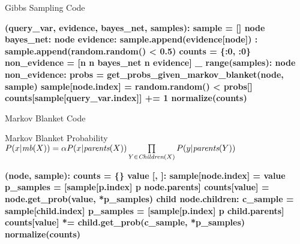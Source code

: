 \documentclass[14pt]{beamer}
\begin{document}
\begin{frame}[fragile]{Gibbs Sampling Code}
	\begin{semiverbatim}\scriptsize\bfseries
		 (query_var, evidence, bayes_net, samples):
		    \pause{}
		    sample = []
		     node  bayes_net:
		         node  evidence:
		            sample.append(evidence[node])
		        :
		            sample.append(random.random() < \num{0.5})
		    \pause{}
		    counts = \{:\num{0}, :\num{0}\}
		    non_evidence = [n  n  bayes_net  n  evidence]
		     _  range(samples):
		         node  non_evidence:
		            \pause{}
		            probs = get_probs_given_markov_blanket(node, sample)
		            \pause{}
		            sample[node.index] = random.random() < probs[]
		            \pause{}
		            counts[sample[query_var.index]] += \num{1}
		    \pause{}
		     normalize(counts)
	\end{semiverbatim}
\end{frame}
\begin{frame}[fragile]{Markov Blanket Code}
	\begin{block}{Markov Blanket Probability}
	\small 
	$P(x|\textit{mb}(X)) = \alpha P(x|\textit{parents}(X)) \prod\limits_{Y \in \textit{\scriptsize Children}(X)}P(y|\textit{parents}(Y))$
	\vspace{-.25em}
	\end{block}
	\vspace{.25em}
	\pause
	\begin{semiverbatim}\scriptsize\bfseries
		 (node, sample):
		    \pause{}
		    counts = \{\}
		     value  [, ]:
		        \pause{}
		        sample[node.index] = value
		        \pause{}
		        p_samples = [sample[p.index]  p  node.parents]
		        counts[value] = node.get_prob(value, *p_samples)
		        \pause{}
		         child  node.children:
		            c_sample = sample[child.index]
		            p_samples = [sample[p.index]  p  child.parents]
		            counts[value] *= child.get_prob(c_sample, *p_samples)
		    \pause{} normalize(counts)
	\end{semiverbatim}
\end{frame}
\end{document}

